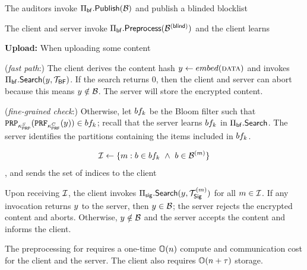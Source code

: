 \item The auditors invoke $\bfACB.\publishList(\blocklist)$ and publish a blinded blocklist \blindedBlocklist

\item The client and server invoke $\bfACB.\preprocess(\blindedBlocklist)$ and the client learns \bfBlklistToken

\enumListEnd

\noindent\textbf{Upload:}
When uploading some content \clientData
\enumListStart
\item (\emph{fast path}:) The client derives the content hash $\genericCInputElmt \assign \embed(\clientData)$ and invokes $\bfACB.\searchBlocklist(\genericCInputElmt, \bfBlklistToken)$. If the search returns 0, then the client and server can abort because this means $\genericCInputElmt \notin \blocklist$. The server will store the encrypted content. 

\item (\emph{fine-grained check}:) Otherwise, let $\bloomFilter[\bloomFilterIdx]$ be the Bloom filter such that $\prp{\prpKeyServer}(\prf{\prfKeyClient}(\genericCInputElmt)) \in \bloomFilter[\bloomFilterIdx]$; recall that the server learns $\bloomFilter[\bloomFilterIdx]$ in $\Pi_{\mathsf{bf}}.\mathsf{Search}$. The server identifies the partitions containing the items included in $\bloomFilter[\bloomFilterIdx]$. 

$$\partitionIDSet \assign \{ \partitionIdx: \genericBlocklistElmt \in \bloomFilter[\bloomFilterIdx] ~\land ~\genericBlocklistElmt \in \blocklistPartition{\partitionIdx}\}$$, and sends the set of indices \partitionIDSet to the client 


\item Upon receiving $\mathcal{I}$, the client invokes $\sigACB.\searchBlocklist(\genericCInputElmt, \sigBlklistToken{\partitionIdx})$ for all $m \in \mathcal{I}$. If any invocation returns $\genericCInputElmt$ to the server, then $\genericCInputElmt \in \blocklist$; the server rejects the encrypted content and aborts. Otherwise, $\genericCInputElmt \notin \blocklist$ and the server accepts the content and informs the client.  
\enumListEnd

%
The preprocessing for \bfBlklistToken requires a one-time $\mathbb{O}(n)$ compute and communication cost for the client and the server. The client also requires $\mathbb{O}(n + \tau)$ storage. 
 
